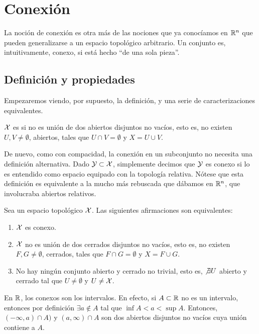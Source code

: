 \chapter{Conexión}
\label{conex}

La noción de conexión es otra más de las nociones que ya conocíamos en $\mathbb{R}^n$ que pueden generalizarse a un espacio topológico arbitrario. Un conjunto es, intuitivamente, conexo, si está hecho ``de una sola pieza''. 

\section{Definición y propiedades}

Empezaremos viendo, por supuesto, la definición, y una serie de caracterizaciones equivalentes.

\begin{defi}[Conexión]
	$\mathcal{X}$ es  si no es unión de dos abiertos disjuntos no vacíos, esto es, no existen $U,V\neq\emptyset$, abiertos, tales que $U\cap V=\emptyset$ y $X=U\cup V$.
\end{defi}

\begin{obs}
	De nuevo, como con compacidad, la conexión en un subconjunto no necesita una definición alternativa. Dado $\mathcal{Y}\subset\mathcal{X}$, simplemente decimos que $\mathcal{Y}$ es conexo si lo es entendido como espacio equipado con la topología relativa. Nótese que esta definición es equivalente a la mucho más rebuscada que dábamos en $\mathbb{R}^n$, que involucraba abiertos relativos.
\end{obs}

\begin{prop}
	Sea un espacio topológico $\mathcal{X}$. Las siguientes afirmaciones son equivalentes:
	\begin{enumerate}
		\item $\mathcal{X}$ es conexo.
		\item $\mathcal{X}$ no es unión de dos cerrados disjuntos no vacíos, esto es, no existen $F,G\neq\emptyset$, cerrados, tales que $F\cap G=\emptyset$ y $X=F\cup G$.
		\item No hay ningún conjunto abierto y cerrado no trivial, esto es, $\not\exists U$ abierto y cerrado tal que $U\neq\emptyset$ y $U\neq\mathcal{X}$.
	\end{enumerate}
\end{prop}

\begin{exa}
	En $\mathbb{R}$, los conexos son los intervalos. En efecto, si $A\subset\mathbb{R}$ no es un intervalo, entonces por definición $\exists a\notin A$ tal que $\inf A< a < \sup A$. Entonces, $(-\infty, a)\cap A)$ y $(a,\infty)\cap A$ son dos abiertos disjuntos no vacíos cuya unión contiene a $A$.
\end{exa}

